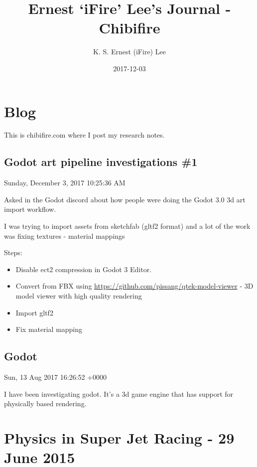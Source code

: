 \documentclass[]{book}
\title{Ernest `iFire' Lee's Journal - Chibifire}
\author{K. S. Ernest (iFire) Lee}
\date{2017-12-03}
\providecommand{\tightlist}{%
  \setlength{\itemsep}{0pt}\setlength{\parskip}{0pt}}
\begin{document}
\maketitle

{
\setcounter{tocdepth}{1}
\tableofcontents
}
\chapter{Blog}\label{intro}

This is chibifire.com where I post my research notes.

\section{Godot art pipeline investigations
\#1}\label{godot-art-pipeline-investigations-1}

 Sunday, December 3, 2017 10:25:36 AM

Asked in the Godot discord about how people were doing the Godot 3.0 3d
art import workflow.

I was trying to import assets from sketchfab (gltf2 format) and a lot of
the work was fixing textures - material mappings

Steps:

\begin{itemize}
\tightlist
\item
  Disable ect2 compression in Godot 3 Editor.
\item
  Convert from FBX using
  \url{https://github.com/pissang/qtek-model-viewer} - 3D model viewer
  with high quality rendering
\item
  Import gltf2
\item
  Fix material mapping
\end{itemize}

\section{Godot}\label{godot}

 Sun, 13 Aug 2017 16:26:52 +0000

I have been investigating godot. It's a 3d game engine that has support
for physically based rendering.

\chapter{Physics in Super Jet Racing - 29 June
2015}\label{physics-in-super-jet-racing---29-june-2015}
\end{document}
